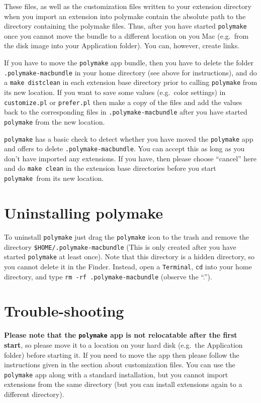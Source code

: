 \documentclass[a4paper]{amsart}
\newcommand{\polymake}{\texttt{polymake}\xspace}
\begin{document}
These files, as well as the customization files written to your extension directory when you import an extension into polymake contain the absolute path to the directory containing the polymake files. Thus, after you have started \polymake once you cannot move the bundle to a different location on you Mac (e.g.\ from the disk image into your Application folder). You can, however, create links.

If you have to move the \polymake app bundle, then you have to delete the folder \texttt{.polymake-macbundle} in your home directory (see above for instructions), and do a \texttt{make distclean} in each extension base directory prior to calling \polymake from its new location. If you want to save some values (e.g.\ color settings) in \texttt{customize.pl} or \texttt{prefer.pl} then make a copy of the files and add the values back to the corresponding files in \texttt{.polymake-macbundle} after you have started \polymake from the new location.

\polymake has a basic check to detect whether you have moved the \polymake app and offers to delete \texttt{.polymake-macbundle}. You can accept this as long as you don't have imported any extensions. If you have, then please choose ``cancel'' here and do \texttt{make clean} in the extension base directories before you start \polymake\ from its new location.

\section*{Uninstalling polymake}

To uninstall \polymake just drag the \polymake icon to the trash and remove the directory \texttt{\${HOME}/.polymake-macbundle} (This is only created after you have started \polymake at least once). Note that this directory is a hidden directory, so you cannot delete it in the Finder. Instead, open a \texttt{Terminal}, \texttt{cd} into your home directory, and type \texttt{rm -rf .polymake-macbundle} (observe the ``.'').

\section*{Trouble-shooting}

\textbf{Please note that the \polymake app is not relocatable after the first start}, so please move it to a location on your hard disk (e.g.\ the Application folder) before starting it. If you need to move the app then please follow the instructions given in the section about customization files. You can use the \polymake app along with a standard installation, but you cannot import extensions from the same directory (but you can install extensions again to a different directory).
\end{document}
